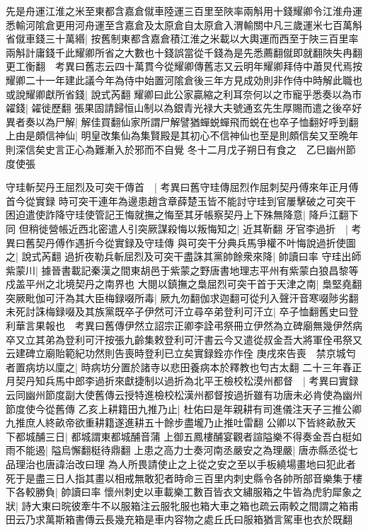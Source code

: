 先是舟運江淮之米至東都含嘉倉僦車陸運三百里至陜率兩斛用十錢耀卿令江淮舟運悉輸河隂倉更用河舟運至含嘉倉及太原倉自太原倉入渭輸關中凡三歲運米七百萬斛省僦車錢三十萬緡|{
	按舊制東都含嘉倉積江淮之米載以大輿運而西至于陜三百里率兩斛計庸錢千此耀卿所省之大數也十錢誤當從千錢為是先悉薦翻僦即就翻陜失冉翻更工衡翻　考異曰舊志云四十萬貫今從耀卿傳舊志又云明年耀卿拜侍中蕭炅代焉按耀卿二十一年建此議今年為侍中始置河隂倉後三年方見成効則非作侍中時解此職也}
或說耀卿獻所省錢|{
	說式芮翻}
耀卿曰此公家贏縮之利耳奈何以之市寵乎悉奏以為市糴錢|{
	糴徙歷翻}
張果固請歸恒山制以為銀青光禄大夫號通玄先生厚賜而遣之後卒好異者奏以為尸解|{
	解佳買翻仙家所謂尸解譬猶蟬蜕蟬飛而蜕在也卒子恤翻好呼到翻}
上由是頗信神仙|{
	明皇改集仙為集賢殿是其初心不信神仙也至是則頗信矣又至晩年則深信矣史言正心為難漸入於邪而不自覺}
冬十二月戊子朔日有食之　乙巳幽州節度使張

守珪斬契丹王屈烈及可突干傳首　|{
	考異曰舊守珪傳屈烈作屈刺契丹傅來年正月傅首今從實録}
時可突干連年為邊患趙含章薛楚玉皆不能討守珪到官屢擊破之可突干困迫遣使詐降守珪使管記王悔就撫之悔至其牙帳察契丹上下殊無降意|{
	降戶江翻下同}
但稍徙營帳近西北密遣人引突厥謀殺悔以叛悔知之|{
	近其靳翻}
牙官李過折　|{
	考異曰舊契丹傅作遇折今從實録及守珪傳}
與可突干分典兵馬爭權不叶悔說過折使圖之|{
	說式芮翻}
過折夜勒兵斬屈烈及可突干盡誅其黨帥餘衆來降|{
	帥讀曰率}
守珪出師紫蒙川|{
	據晉書載記秦漢之間東胡邑于紫蒙之野唐書地理志平州有紫蒙白狼昌黎等戍盖平州之北境契丹之南界也}
大閱以鎮撫之梟屈烈可突干首于天津之南|{
	梟堅堯翻}
突厥毗伽可汗為其大臣梅録啜所毒|{
	厥九勿翻伽求迦翻可從刋入聲汗音寒啜陟劣翻}
未死討誅梅録啜及其族黨既卒子伊然可汗立尋卒弟登利可汗立|{
	卒子恤翻舊史曰登利華言果報也　考異曰舊傳伊然立詔宗正卿李詮弔祭冊立伊然為立碑廟無幾伊然病卒又立其弟為登利可汗按張九齡集敕登利可汗書云今又遣從叔金吾大將軍佺弔祭又云建碑立廟貽範紀功然則告喪時登利已立矣實録銓亦作佺}
庚戌來告喪　禁京城匄者置病坊以廩之|{
	時病坊分置於諸寺以悲田養病本於釋教也匄古太翻}
二十三年春正月契丹知兵馬中郎李過折來獻捷制以過折為北平王檢校松漠州都督　|{
	考異曰實録云同幽州節度副大使舊傳云授特進檢校松漢州都督按過折雖有功唐未必肯使為幽州節度使今從舊傳}
乙亥上耕籍田九推乃止|{
	杜佑曰是年親耕有司進儀注天子三推公卿九推庶人終畝帝欲重耕籍遂進耕五十餘步盡壠乃止推吐雷翻}
公卿以下皆終畝赦天下都城酺三日|{
	都城謂東都城酺音蒲}
上御五鳳樓酺宴觀者諠隘樂不得奏金吾白梃如雨不能遏|{
	隘烏懈翻梃待鼎翻}
上患之高力士奏河南丞嚴安之為理嚴|{
	唐赤縣丞從七品理治也唐諱治改曰理}
為人所畏請使止之上從之安之至以手板繞場畫地曰犯此者死于是盡三日人指其畫以相戒無敢犯者時命三百里内刺史縣令各帥所部音樂集于樓下各較勝負|{
	帥讀曰率}
懷州刺史以車載樂工數百皆衣文繡服箱之牛皆為虎豹犀象之狀|{
	詩大東曰晥彼牽牛不以服箱注云服牝服也箱大車之箱也疏云兩較之間謂之箱甫田云乃求萬斯箱書傳云長幾充箱是車内容物之處丘氏曰服箱猶言駕車也衣於既翻}
